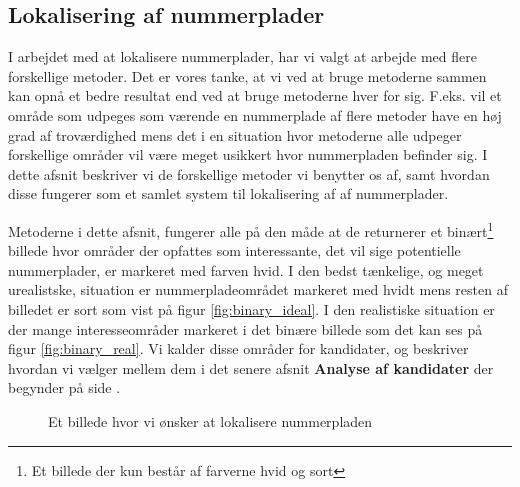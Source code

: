 \label{sec_billed}

\subsection{Lokalisering af nummerplader}



I arbejdet med at lokalisere nummerplader, har vi valgt at arbejde med flere forskellige metoder. Det er vores tanke, at vi ved at bruge metoderne sammen kan opnå et bedre resultat end ved at bruge metoderne hver for sig. F.eks. vil et område som udpeges som værende en nummerplade af flere metoder have en høj grad af troværdighed mens det i en situation hvor metoderne alle udpeger forskellige områder vil være meget usikkert hvor nummerpladen befinder sig. I dette afsnit beskriver vi de forskellige metoder vi benytter os af, samt hvordan disse fungerer som et samlet system til lokalisering af af nummerplader. 

Metoderne i dette afsnit, fungerer alle på den måde at de returnerer et binært\footnote{Et billede der kun består af farverne hvid og sort} billede hvor områder der opfattes som interessante, det vil sige potentielle nummerplader, er markeret med farven hvid. I den bedst tænkelige, og meget urealistske, situation er nummerpladeområdet markeret med hvidt mens resten af billedet er sort som vist på figur \vref{fig:binary_ideal}. I den realistiske situation er der mange interesseområder markeret i det binære billede som det kan ses på figur \vref{fig:binary_real}. Vi kalder disse områder for kandidater, og beskriver hvordan vi vælger mellem dem i det senere afsnit \textbf{Analyse af kandidater} der begynder på side \pageref{sec:kandidater}.

\begin{figure}[htp]
\centering
{} 
\caption{Et billede hvor vi ønsker at lokalisere nummerpladen}
\label{fig:input_billede}
\end{figure}


